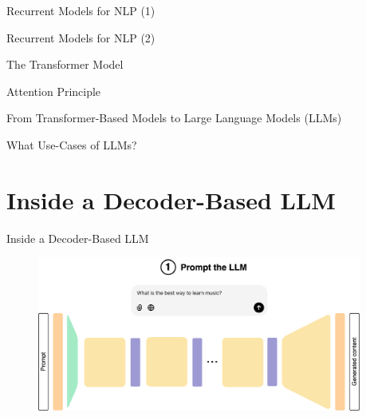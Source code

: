 \documentclass[11pt,aspectratio=169]{beamer}
\begin{document}
\begin{frame}{Recurrent Models for NLP (1)}
    
\end{frame}

\begin{frame}{Recurrent Models for NLP (2)}
    
\end{frame}

\begin{frame}{The Transformer Model}
    
\end{frame}

\begin{frame}{Attention Principle}
    
\end{frame}

\begin{frame}{From Transformer-Based Models to Large Language Models (LLMs)}
\end{frame}

\begin{frame}{What Use-Cases of LLMs?}
    
\end{frame}

\section{Inside a Decoder-Based LLM}

\begin{frame}{Inside a Decoder-Based LLM}
    \begin{figure}
        \centering
        \includegraphics[width=0.95\textwidth]{llm_1.png}
    \end{figure}
\end{frame}
\end{document}
